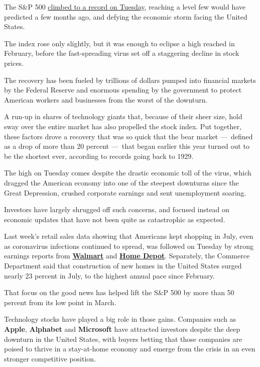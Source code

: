 The S\&P 500
\href{https://www.nytimes3xbfgragh.onion/2020/08/18/business/stock-market-record.html}{climbed
to a record on Tuesday}, reaching a level few would have predicted a few
months ago, and defying the economic storm facing the United States.

The index rose only slightly, but it was enough to eclipse a high
reached in February, before the fast-spreading virus set off a
staggering decline in stock prices.

The recovery has been fueled by trillions of dollars pumped into
financial markets by the Federal Reserve and enormous spending by the
government to protect American workers and businesses from the worst of
the downturn.

A run-up in shares of technology giants that, because of their sheer
size, hold sway over the entire market has also propelled the stock
index. Put together, these factors drove a recovery that was so quick
that the bear market ---~defined as a drop of more than 20 percent
---~that began earlier this year turned out to be the shortest ever,
according to records going back to 1929.

The high on Tuesday comes despite the drastic economic toll of the
virus, which dragged the American economy into one of the steepest
downturns since the Great Depression, crushed corporate earnings and
sent unemployment soaring.

Investors have largely shrugged off such concerns, and focused instead
on economic updates that have not been quite as catastrophic as
expected.

Last week's retail sales data showing that Americans kept shopping in
July, even as coronavirus infections continued to spread, was followed
on Tuesday by strong earnings reports from
\textbf{\href{https://www.nytimes3xbfgragh.onion/live/2020/08/18/business/stock-market-today-coronavirus/walmarts-e-commerce-sales-jump-by-97-percent}{Walmart}}
and
\textbf{\href{https://www.nytimes3xbfgragh.onion/live/2020/08/18/business/stock-market-today-coronavirus/home-depot-reports-surge-in-second-quarter-sales}{Home
Depot}}. Separately, the Commerce Department said that construction of
new homes in the United States surged nearly 23 percent in July, to the
highest annual pace since February.

That focus on the good news has helped lift the S\&P 500 by more than 50
percent from its low point in March.

Technology stocks have played a big role in those gains. Companies such
as \textbf{Apple}, \textbf{Alphabet} and \textbf{Microsoft} have
attracted investors despite the deep downturn in the United States, with
buyers betting that those companies are poised to thrive in a
stay-at-home economy and emerge from the crisis in an even stronger
competitive position.

